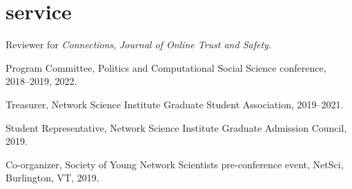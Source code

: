\documentclass[11pt, letter]{article}
\begin{document}
 \section{service}
 Reviewer for \textit{Connections}, \textit{Journal of Online Trust and Safety}.

 Program Committee, Politics and Computational Social Science conference,
 2018--2019, 2022.

 Treasurer, Network Science Institute Graduate Student Association, 2019--2021.

 Student Representative, Network Science Institute Graduate Admission Council,
 2019.

 Co-organizer, Society of Young Network Scientists pre-conference event, NetSci,
 Burlington, VT, 2019.
\end{document}

